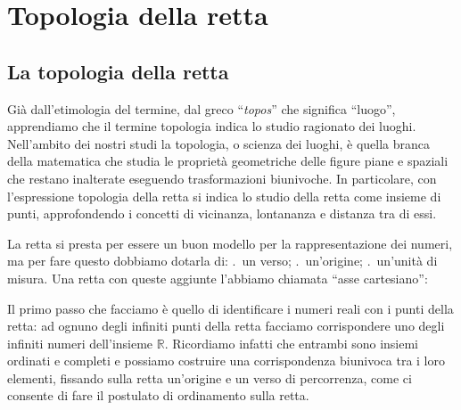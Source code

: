 


\chapter{Topologia della retta}

\section{La topologia della retta}
Già dall'etimologia del termine, dal greco ``\emph{topos}'' che significa 
``luogo'', apprendiamo che il termine topologia indica lo studio 
ragionato dei luoghi. 
Nell'ambito dei nostri studi la topologia, o scienza dei luoghi, 
è quella branca della matematica che studia le proprietà geometriche 
delle figure piane e spaziali che restano inalterate eseguendo 
trasformazioni biunivoche. 
In particolare, con l'espressione topologia della retta si indica 
lo studio della retta come insieme di punti, approfondendo i concetti di 
vicinanza, lontananza e distanza tra di essi.

La retta si presta per essere un buon modello per la rappresentazione dei 
numeri, ma per fare questo dobbiamo dotarla di: .~un verso; .~un'origine; .~un'unità di misura.
Una retta con queste aggiunte l'abbiamo chiamata ``asse cartesiano'':
\begin{center}
\asseconpunti
\end{center}




Il primo passo che facciamo è quello di identificare i numeri reali con i 
punti della retta: ad ognuno degli infiniti punti della retta facciamo 
corrispondere uno degli infiniti numeri dell'insieme \(\mathbb{R}\). 
Ricordiamo infatti che entrambi sono insiemi ordinati e completi e possiamo 
costruire una corrispondenza biunivoca tra i loro elementi, fissando sulla 
retta un'origine e un verso di percorrenza, come ci consente di fare il 
postulato di ordinamento sulla retta.

